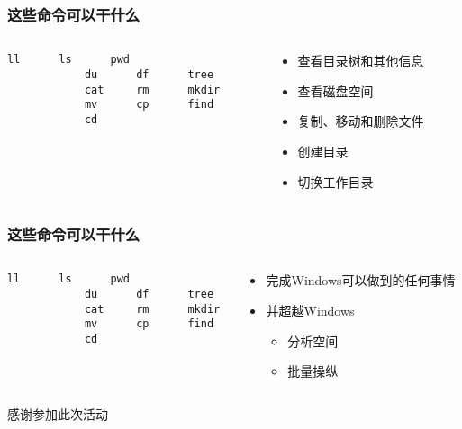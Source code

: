\begin{frame} [fragile]
	\frametitle{这些命令可以干什么}
	\linespread{1.5}
	\begin{columns}[T]
		\begin{column}[T]{.5\textwidth}
			\begin{lstlisting}[style=bashstyle, gobble=12, texcl]
			ll		ls		pwd
			du		df		tree
			cat		rm		mkdir
			mv		cp		find
			cd
			\end{lstlisting}
		\end{column}
		\begin{column}[T]{.5\textwidth}
			\begin{itemize}
			\item 查看目录树和其他信息
			\item 查看磁盘空间
			\item 复制、移动和删除文件
			\item 创建目录
			\item 切换工作目录
			\end{itemize}
		\end{column}
	\end{columns}
\end{frame}

\begin{frame} [fragile]
	\frametitle{这些命令可以干什么}
	\linespread{1.5}
	\begin{columns}[T]
		\begin{column}[T]{.5\textwidth}
			\begin{lstlisting}[style=bashstyle, gobble=12, texcl]
			ll		ls		pwd
			du		df		tree
			cat		rm		mkdir
			mv		cp		find
			cd
			\end{lstlisting}
		\end{column}
		\begin{column}[T]{.5\textwidth}
			\begin{itemize}
			\item 完成Windows可以做到的任何事情
			\item 并超越Windows
				\begin{itemize}
				\item 分析空间
				\item 批量操纵
				\end{itemize}
			\end{itemize}
		\end{column}
	\end{columns}
\end{frame}

\PreLastFrame
\begin{frame}
	\centerline{\fontsize{32}{32}\selectfont 感谢参加此次活动}
\end{frame}

\newpage


